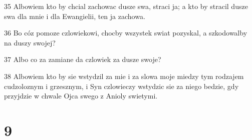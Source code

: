 \par 35 Albowiem kto by chcial zachowac dusze swa, straci ja; a kto by stracil dusze swa dla mnie i dla Ewangielii, ten ja zachowa.
\par 36 Bo cóz pomoze czlowiekowi, chocby wszystek swiat pozyskal, a szkodowalby na duszy swojej?
\par 37 Albo co za zamiane da czlowiek za dusze swoje?
\par 38 Albowiem kto by sie wstydzil za mie i za slowa moje miedzy tym rodzajem cudzoloznym i grzesznym, i Syn czlowieczy wstydzic sie za niego bedzie, gdy przyjdzie w chwale Ojca swego z Anioly swietymi.

\chapter{9}

